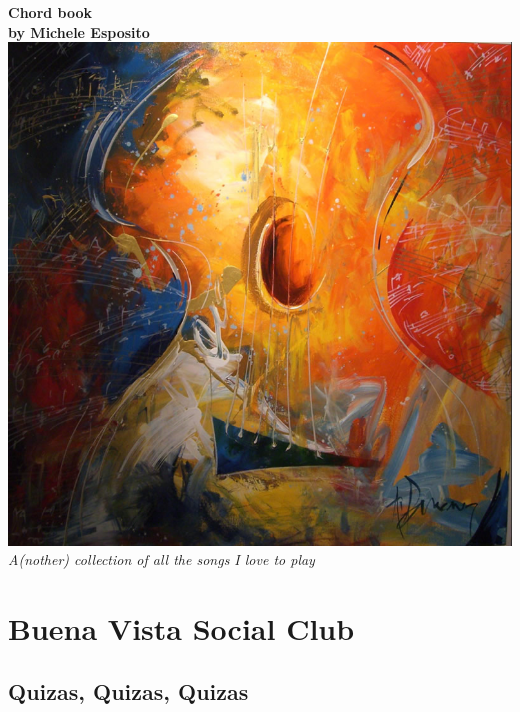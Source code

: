\documentclass[a4paper]{article}
\begin{document}
\begin{center}
\vspace{3cm}
{\bf{\huge Chord book }}\\
\vspace{2cm}
{\bf by Michele Esposito} \\
\vspace{2cm}
\includegraphics[scale=.6]{guitar2.png}\\
\vspace{1cm}
\emph{A(nother) collection of all the songs I love to play}
\end{center}
\newpage
\tableofcontents
\newpage
\section{Buena Vista Social Club} %
\label{sec:Buena Vista Social Club}
\subsection{Quizas, Quizas, Quizas} %
\label{sub:Quizas, Quizas, Quizas}
\end{document}
